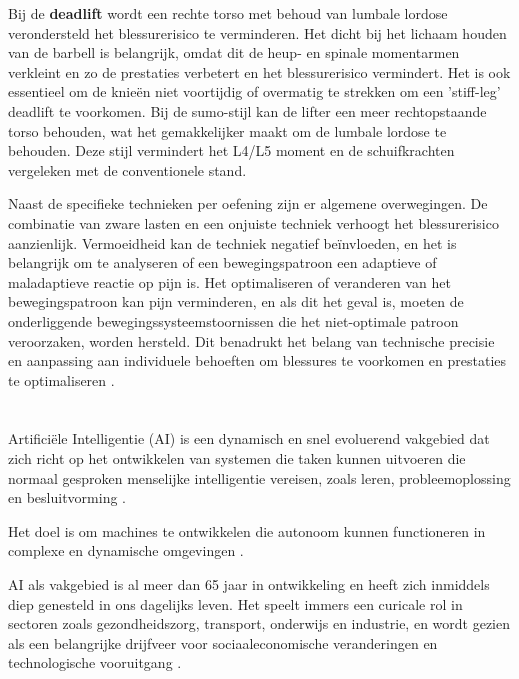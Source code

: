 \medskip

Bij de \textbf{deadlift} wordt een rechte torso met behoud van lumbale lordose verondersteld het blessurerisico te verminderen. 
Het dicht bij het lichaam houden van de barbell is belangrijk, omdat dit de heup- en spinale momentarmen verkleint en zo de prestaties verbetert en het blessurerisico vermindert. 
Het is ook essentieel om de knieën niet voortijdig of overmatig te strekken om een 'stiff-leg' deadlift te voorkomen. 
Bij de sumo-stijl kan de lifter een meer rechtopstaande torso behouden, wat het gemakkelijker maakt om de lumbale lordose te behouden. 
Deze stijl vermindert het L4/L5 moment en de schuifkrachten vergeleken met de conventionele stand.

\medskip

Naast de specifieke technieken per oefening zijn er algemene overwegingen. 
De combinatie van zware lasten en een onjuiste techniek verhoogt het blessurerisico aanzienlijk. 
Vermoeidheid kan de techniek negatief beïnvloeden, en het is belangrijk om te analyseren of een bewegingspatroon een adaptieve of maladaptieve reactie op pijn is. 
Het optimaliseren of veranderen van het bewegingspatroon kan pijn verminderen, en als dit het geval is, moeten de onderliggende bewegingssysteemstoornissen die het niet-optimale patroon veroorzaken, worden hersteld. 
Dit benadrukt het belang van technische precisie en aanpassing aan individuele behoeften om blessures te voorkomen en prestaties te optimaliseren \autocite{TymchikEtAl2021}.



\section{}%
\label{sec:artificiële-intelligentie}

Artificiële Intelligentie (AI) is een dynamisch en snel evoluerend vakgebied dat zich richt op het ontwikkelen van systemen die taken kunnen uitvoeren die normaal gesproken menselijke intelligentie vereisen, zoals leren, probleemoplossing en besluitvorming \autocite{SharifaniEtAl2023}.

Het doel is om machines te ontwikkelen die autonoom kunnen functioneren in complexe en dynamische omgevingen \autocite{Kouassi2023}.

AI als vakgebied is al meer dan 65 jaar in ontwikkeling en heeft zich inmiddels diep genesteld in ons dagelijks leven. Het speelt immers een curicale rol in sectoren zoals gezondheidszorg, transport, onderwijs en industrie, en wordt gezien als een belangrijke drijfveer voor sociaaleconomische veranderingen en technologische vooruitgang \autocite{JiangEtAl2022}.

